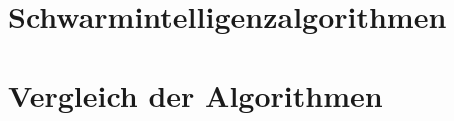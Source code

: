 \documentclass[12pt, a4paper]{report}
\begin{document}

\chapter{Schwarmintelligenzalgorithmen}

\chapter{Vergleich der Algorithmen}

\printbibliography
\end{document}
